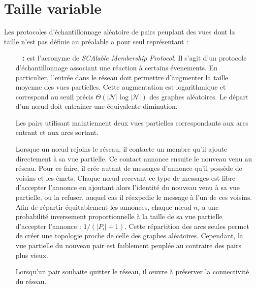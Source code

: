 

\section{Taille variable}

Les protocoles d'échantillonnage aléatoire de pairs peuplant des vues dont la
taille n'est pas définie au préalable a pour seul représentant :

\begin{itemize}
\item [\textbf{\SCAMP~\cite{ganesh2001scamp, ganesh2003peer} :}] est l'acronyme
  de \emph{SCAlable Membership Protocol}. Il s'agit d'un protocole
  d'échantillonnage associant une réaction à certains évenements. En
  particulier, l'entrée dans le réseau doit permettre d'augmenter la taille
  moyenne des vues partielles. Cette augmentation est logarithmique et
  correspond au seuil précis $\Theta (|\mathcal{N}|\log |\mathcal{N}|)$ des
  graphes aléatoires. Le départ d'un nœud doit entrainer une équivalente
  diminution.

  Les pairs utilisant \SCAMP maintiennent deux vues partielles correspondants
  aux arcs entrant et aux arcs sortant.

  Lorsque un nœud rejoins le réseau, il contacte un membre qu'il ajoute
  directement à sa vue partielle. Ce contact annonce ensuite le nouveau venu au
  réseau. Pour ce faire, il crée autant de messages d'annonce qu'il possède de
  voisins et les émets. Chaque nœud recevant ce type de messages est libre
  d'accepter l'annonce en ajoutant alors l'identité du nouveau venu à sa vue
  partielle, ou la refuser, auquel cas il réexpedie le message à l'un de ces
  voisins. Afin de répartir équitablement les annonces, chaque nœud $n_i$ a une
  probabilité inversement proportionnelle à la taille de sa vue partielle
  d'accepter l'annonce : $1/(|P_i|+1)$. Cette répartition des arcs seules permet
  de créer une topologie proche de celle des graphes aléatoires. Cependant, la
  vue partielle du nouveau pair est faiblement peuplée au contraire des pairs
  plus vieux.

  Lorsqu'un pair souhaite quitter le réseau, il œuvre à préserver la
  connectivité du réseau. 
\end{itemize}


